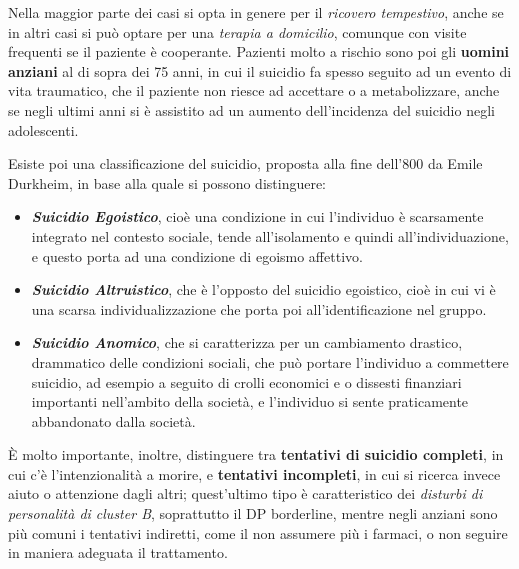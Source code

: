 \documentclass[]{article}
\begin{document}
Nella maggior parte dei casi si opta in genere per il \emph{ricovero
tempestivo}, anche se in altri casi si può optare per una \emph{terapia
a domicilio}, comunque con visite frequenti se il paziente è cooperante.
Pazienti molto a rischio sono poi gli \textbf{uomini} \textbf{anziani}
al di sopra dei 75 anni, in cui il suicidio fa spesso seguito ad un
evento di vita traumatico, che il paziente non riesce ad accettare o a
metabolizzare, anche se negli ultimi anni si è assistito ad un aumento
dell'incidenza del suicidio negli adolescenti.

Esiste poi una classificazione del suicidio, proposta alla fine dell'800
da Emile Durkheim, in base alla quale si possono distinguere:

\begin{itemize}
\item
  \textbf{\emph{Suicidio Egoistico}}, cioè una condizione in cui
  l'individuo è scarsamente integrato nel contesto sociale, tende
  all'isolamento e quindi all'individuazione, e questo porta ad una
  condizione di egoismo affettivo.
\item
  \textbf{\emph{Suicidio Altruistico}}, che è l'opposto del suicidio
  egoistico, cioè in cui vi è una scarsa individualizzazione che porta
  poi all'identificazione nel gruppo.
\item
  \textbf{\emph{Suicidio Anomico}}, che si caratterizza per un
  cambiamento drastico, drammatico delle condizioni sociali, che può
  portare l'individuo a commettere suicidio, ad esempio a seguito di
  crolli economici e o dissesti finanziari importanti nell'ambito della
  società, e l'individuo si sente praticamente abbandonato dalla
  società.
\end{itemize}

È molto importante, inoltre, distinguere tra \textbf{tentativi di
suicidio completi}, in cui c'è l'intenzionalità a morire, e
\textbf{tentativi incompleti}, in cui si ricerca invece aiuto o
attenzione dagli altri; quest'ultimo tipo è caratteristico dei
\emph{disturbi di personalità di cluster B}, soprattutto il DP
borderline, mentre negli anziani sono più comuni i tentativi indiretti,
come il non assumere più i farmaci, o non seguire in maniera adeguata il
trattamento.
\end{document}
